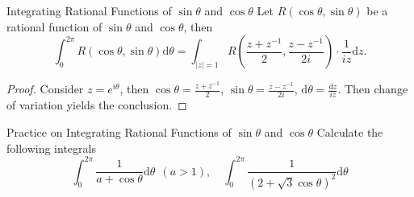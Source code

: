 \begin{proposition}{Integrating Rational Functions of $\sin \theta$ and $\cos \theta$}{}
  Let $R(\cos \theta, \sin \theta)$ be a rational function of $\sin \theta$ and $\cos \theta$,
  then
  \begin{equation}
    \int_0^{2\pi} R(\cos \theta, \sin \theta) \mathrm{d} \theta
    = \int_{|z| = 1} R(\frac{z + z^{-1}}{2}, \frac{z - z^{-1}}{2i}) \cdot \frac{1}{iz}\mathrm{d} z.
  \end{equation}
\end{proposition}

\begin{proof}
  Consider $z = e^{i\theta}$, then $\cos \theta = \frac{z + z^{-1}}{2}$,
  $\sin \theta = \frac{z - z^{-1}}{2i}$, $\mathrm{d} \theta = \frac{\mathrm{d} z}{iz}$.
  Then change of variation yields the conclusion.
\end{proof}

\begin{example}{Practice on Integrating Rational Functions of $\sin \theta$ and $\cos \theta$}{}
  Calculate the following integrals
  \begin{equation}
    \int_0^{2\pi} \frac{1}{a + \cos \theta}\mathrm{d} \theta ~~ (a > 1), \quad
    \int_0^{2\pi} \frac{1}{(2 + \sqrt{3} \cos \theta)^2}\mathrm{d} \theta
  \end{equation}
\end{example}


